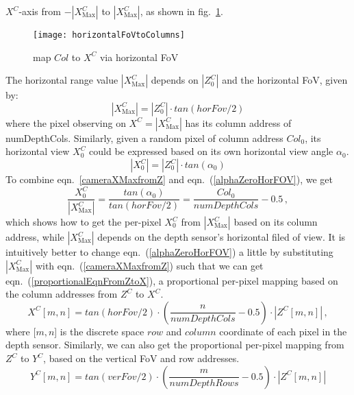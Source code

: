 \(X^C\)-axis from \(-|X^C_{\text{Max}}|\) to \(|X^C_{\text{Max}}|\), as shown in fig.~\ref{horizontalFoVtoColumns}. %
\begin{figure}[!t]
\centering
\texttt{[image: horizontalFoVtoColumns]}
\caption{map \(Col\) to \(X^C\) via horizontal FoV}
\label{horizontalFoVtoColumns}
\end{figure}%
%
The horizontal range value \(|X^C_{\text{Max}}|\) depends on \(|Z^C_0|\) and the horizontal FoV, given by:
%
\begin{equation}
|X^C_{\text{Max}}| = |Z^C_0| \cdot tan(horFov / 2) 
\label{cameraXMaxfromZ}
\end{equation}%
\noindent
where the pixel observing on \(X^C = |X^C_{\text{Max}}|\) has its column address of numDepthCols. Similarly, given a random pixel of column address \(Col_0\), its horizontal view \(X^C_0\) could be expressed based on its own horizontal view angle \(\alpha_0\).
%
\begin{equation}
|X^C_{0}| = |Z^C_0| \cdot tan(\alpha_0)
\label{alphaZeroHorFOV}
\end{equation}%
\noindent
To combine eqn.~\ref{cameraXMaxfromZ} and eqn.~(\ref{alphaZeroHorFOV}), we get
%
\begin{equation}
\frac{X^C_0}{|X^C_{\text{Max}}|} = \frac{tan(\alpha_0)}{tan(horFov / 2)} = \frac{Col_0}{numDepthCols} - 0.5 \, ,
\label{alphaZeroHorFOV}
\end{equation}%
\noindent
which shows how to get the per-pixel \(X^C_0\) from \(|X^C_{\text{Max}}|\) based on its column address, while \(|X^C_{\text{Max}}|\) depends on the depth sensor's horizontal filed of view. It is intuitively better to change eqn.~(\ref{alphaZeroHorFOV}) a little by substituting \(|X^C_{\text{Max}}|\) with eqn.~(\ref{cameraXMaxfromZ}) such that we can get eqn.~(\ref{proportionalEqnFromZtoX}), a proportional per-pixel mapping based on the column addresses from \(Z^C\) to \(X^C\).
%
\begin{equation}
X^C[m, n] = tan(horFov / 2) \cdot (\frac{n}{numDepthCols} - 0.5) \cdot |Z^C[m, n]|\, ,
\label{proportionalEqnFromZtoX}
\end{equation}%
\noindent
where [\(m,n\)] is the discrete space \(row\) and \(column\) coordinate of each pixel in the depth sensor. Similarly, we can also get the proportional per-pixel mapping from \(Z^C\) to \(Y^C\), based on the vertical FoV and row addresses.
%
\begin{equation}
Y^C[m, n] = tan(verFov / 2) \cdot (\frac{m}{numDepthRows} - 0.5) \cdot |Z^C[m, n]|
\label{proportionalEqnFromZtoY}
\end{equation}%
